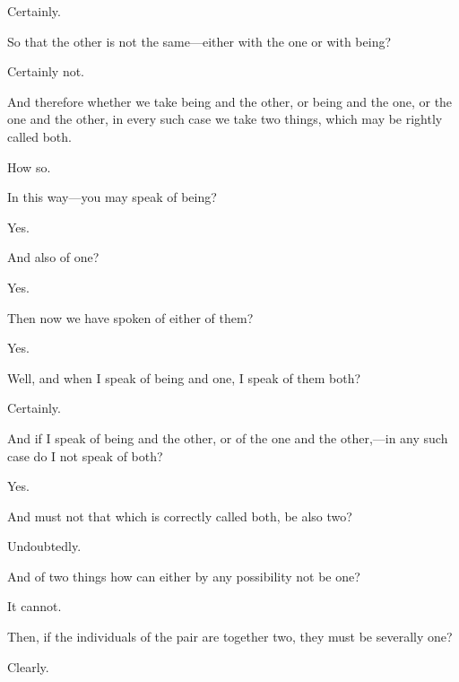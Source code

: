 \documentclass[11pt,letter]{article}
\begin{document}
\par  Certainly.

\par  So that the other is not the same—either with the one or with being?

\par  Certainly not.

\par  And therefore whether we take being and the other, or being and the one, or the one and the other, in every such case we take two things, which may be rightly called both.

\par  How so.

\par  In this way—you may speak of being?

\par  Yes.

\par  And also of one?

\par  Yes.

\par  Then now we have spoken of either of them?

\par  Yes.

\par  Well, and when I speak of being and one, I speak of them both?

\par  Certainly.

\par  And if I speak of being and the other, or of the one and the other,—in any such case do I not speak of both?

\par  Yes.

\par  And must not that which is correctly called both, be also two?

\par  Undoubtedly.

\par  And of two things how can either by any possibility not be one?

\par  It cannot.

\par  Then, if the individuals of the pair are together two, they must be severally one?

\par  Clearly.
\end{document}
